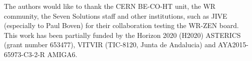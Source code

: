 The authors would like to thank the CERN BE-CO-HT unit, the WR community, the Seven Solutions staff and
other institutions, such as JIVE (especially to Paul Boven) for their collaboration testing the
WR-ZEN board. This work has been partially funded by the Horizon 2020 (H2020) ASTERICS (grant number 653477),
VITVIR (TIC-8120, Junta de Andalucia) and AYA2015-65973-C3-2-R AMIGA6.